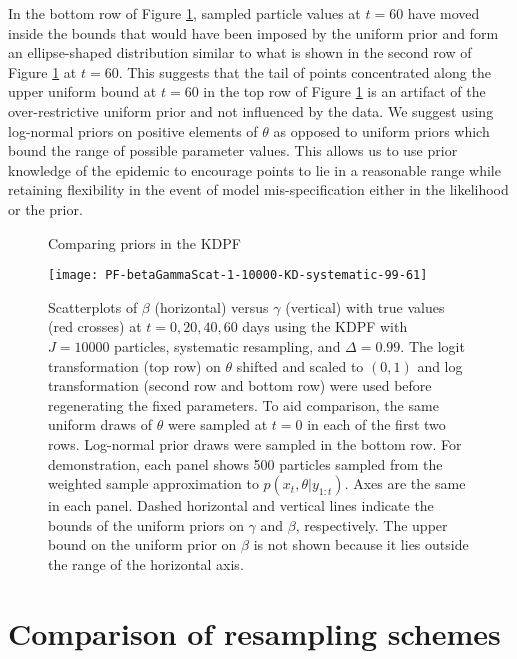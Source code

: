 In the bottom row of Figure \ref{fig:epid:priors}, sampled particle values at $t = 60$ have moved inside the bounds that would have been imposed by the uniform prior and form an ellipse-shaped distribution similar to what is shown in the second row of Figure \ref{fig:epid:priors} at $t = 60$. This suggests that the tail of points concentrated along the upper uniform bound at $t = 60$ in the top row of Figure \ref{fig:epid:priors} is an artifact of the over-restrictive uniform prior and not influenced by the data. We suggest using log-normal priors on positive elements of $\theta$ as opposed to uniform priors which bound the range of possible parameter values. This allows us to use prior knowledge of the epidemic to encourage points to lie in a reasonable range while retaining flexibility in the event of model mis-specification either in the likelihood or the prior.

\begin{figure}
\ssp
\centering
\caption{Comparing priors in the KDPF} \label{fig:epid:priors}
\begin{minipage}{1.0\linewidth}
\texttt{[image: PF-betaGammaScat-1-10000-KD-systematic-99-61]}
\caption*{Scatterplots of $\beta$ (horizontal) versus $\gamma$ (vertical) with true values (red crosses) at $t = 0, 20, 40, 60$ days using the KDPF with $J = 10000$ particles, systematic resampling, and $\Delta = 0.99$. The logit transformation (top row) on $\theta$ shifted and scaled to $(0,1)$ and log transformation (second row and bottom row) were used before regenerating the fixed parameters. To aid comparison, the same uniform draws of $\theta$ were sampled at $t = 0$ in each of the first two rows. Log-normal prior draws were sampled in the bottom row. For demonstration, each panel shows 500 particles sampled from the weighted sample approximation to $p(x_t,\theta|y_{1:t})$. Axes are the same in each panel. Dashed horizontal and vertical lines indicate the bounds of the uniform priors on $\gamma$ and $\beta$, respectively. The upper bound on the uniform prior on $\beta$ is not shown because it lies outside the range of the horizontal axis.}
\end{minipage}
\end{figure}

\section{Comparison of resampling schemes} \label{sec:epid:resample}

